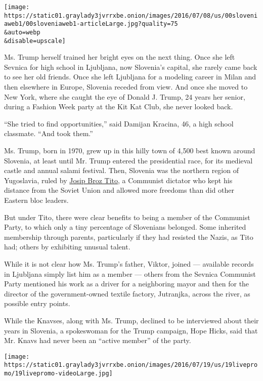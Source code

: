 \texttt{[image: https://static01.graylady3jvrrxbe.onion/images/2016/07/08/us/00sloveniaweb1/00sloveniaweb1-articleLarge.jpg?quality=75\\\&auto=webp\\\&disable=upscale]}

Ms. Trump herself trained her bright eyes on the next thing. Once she
left Sevnica for high school in Ljubljana, now Slovenia's capital, she
rarely came back to see her old friends. Once she left Ljubljana for a
modeling career in Milan and then elsewhere in Europe, Slovenia receded
from view. And once she moved to New York, where she caught the eye of
Donald J. Trump, 24 years her senior, during a Fashion Week party at the
Kit Kat Club, she never looked back.

``She tried to find opportunities,'' said Damijan Kracina, 46, a high
school classmate. ``And took them.''

Ms. Trump, born in 1970, grew up in this hilly town of 4,500 best known
around Slovenia, at least until Mr. Trump entered the presidential race,
for its medieval castle and annual salami festival. Then, Slovenia was
the northern region of Yugoslavia, ruled by
\href{http://nyti.ms/29IAGb3}{Josip Broz Tito}, a Communist dictator who
kept his distance from the Soviet Union and allowed more freedoms than
did other Eastern bloc leaders.

But under Tito, there were clear benefits to being a member of the
Communist Party, to which only a tiny percentage of Slovenians belonged.
Some inherited membership through parents, particularly if they had
resisted the Nazis, as Tito had; others by exhibiting unusual talent.

While it is not clear how Ms. Trump's father, Viktor, joined ---
available records in Ljubljana simply list him as a member --- others
from the Sevnica Communist Party mentioned his work as a driver for a
neighboring mayor and then for the director of the government-owned
textile factory, Jutranjka, across the river, as possible entry points.

While the Knavses, along with Ms. Trump, declined to be interviewed
about their years in Slovenia, a spokeswoman for the Trump campaign,
Hope Hicks, said that Mr. Knavs had never been an ``active member'' of
the party.

\href{https://www.nytimes3xbfgragh.onion/interactive/2016/07/18/us/elections/gop-conventions-speakers.html}{}

\texttt{[image: https://static01.graylady3jvrrxbe.onion/images/2016/07/19/us/19livepromo/19livepromo-videoLarge.jpg]}

